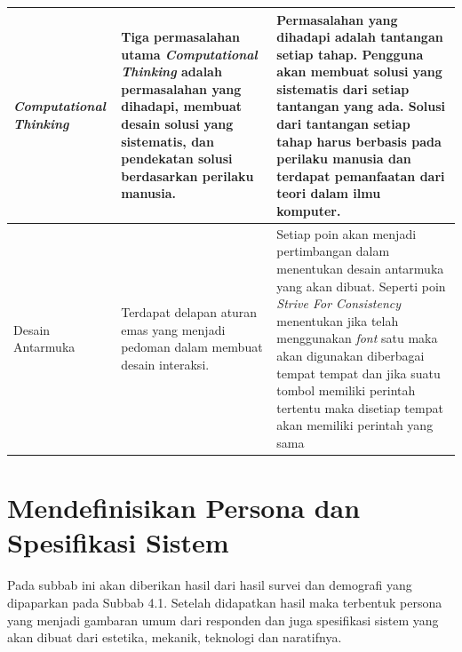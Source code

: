 \begin{longtable}{| p{2cm} | p{5cm} | p{5cm} |}
		\hline
		\textit{Computational Thinking} & Tiga permasalahan utama \textit{Computational Thinking} adalah permasalahan yang dihadapi, membuat desain solusi yang sistematis, dan pendekatan solusi berdasarkan perilaku manusia. & Permasalahan yang dihadapi adalah tantangan setiap tahap. Pengguna akan membuat solusi yang sistematis dari setiap tantangan yang ada. Solusi dari tantangan setiap tahap harus berbasis pada perilaku manusia dan terdapat pemanfaatan dari teori dalam ilmu komputer. \\ 
		\hline
		Desain Antarmuka & Terdapat delapan aturan emas yang menjadi pedoman dalam membuat desain interaksi. & Setiap poin akan menjadi pertimbangan dalam menentukan desain antarmuka yang akan dibuat. Seperti poin \textit{Strive For Consistency} menentukan jika telah menggunakan \textit{font} satu maka akan digunakan diberbagai tempat tempat dan jika suatu tombol memiliki perintah tertentu maka disetiap tempat akan memiliki perintah yang sama \\ 
		\hline
\end{longtable}

\section{Mendefinisikan Persona dan Spesifikasi Sistem}
Pada subbab ini akan diberikan hasil dari hasil survei dan demografi yang dipaparkan pada Subbab 4.1. Setelah didapatkan hasil maka terbentuk persona yang menjadi gambaran umum dari responden dan juga spesifikasi sistem yang akan dibuat dari estetika, mekanik, teknologi dan naratifnya.

